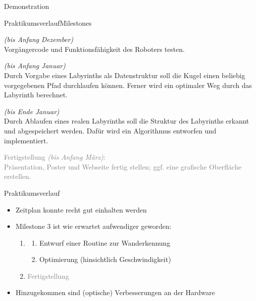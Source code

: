 \documentclass{beamer}
\begin{document}
\begin{frame}[fragile,t]{Demonstration}
\end{frame}

\begin{frame}[fragile,t]{Praktikumsverlauf}{Milestones}
\begin{enumerate}
 \item {} \textit{(bis Anfang Dezember)}\blue{:}\\
 Vorgängercode und Funktionsfähigkeit des Roboters testen.
 \item {} \textit{(bis Anfang Januar)}\blue{:}\\
 Durch Vorgabe eines Labyrinths als Datenstruktur soll die Kugel einen beliebig vorgegebenen Pfad durchlaufen können. Ferner wird ein optimaler Weg durch das Labyrinth berechnet.
 \item {} \textit{(bis Ende Januar)}\blue{:}\\
 Durch Ablaufen eines realen Labyrinths soll die Struktur des Labyrinths erkannt und abgespeichert werden. Dafür wird ein Algorithmus entworfen und implementiert.
 \textcolor{gray}{
 \item[\textcolor{gray}{4.}] Fertigstellung \textit{(bis Anfang März)}:\\
Präsentation, Poster und Webseite fertig stellen; ggf. eine grafische Oberfläche erstellen.
}
\end{enumerate}
\end{frame}

\begin{frame}[fragile,t]{Praktikumsverlauf}
\begin{itemize}
\item Zeitplan konnte recht gut einhalten werden
\item Milestone 3 ist wie erwartet aufwendiger geworden:

\begin{enumerate}
 \item[3.] 
 \begin{enumerate}
 \item[(a)] Entwurf einer Routine zur Wanderkennung
 \item[(b)] Optimierung (hinsichtlich Geschwindigkeit)
 \end{enumerate}
 \item[\textcolor{gray}{4.}] \textcolor{gray}{Fertigstellung}
\end{enumerate}
\item Hinzugekommen sind (optische) Verbesserungen an der Hardware\\
\end{itemize}
\end{frame}
\end{document}
